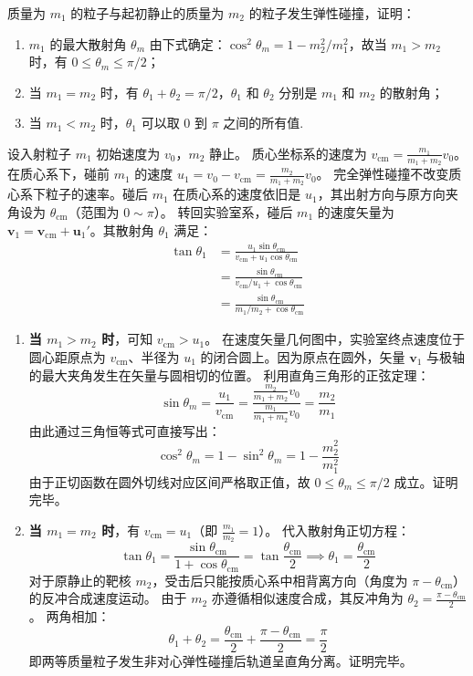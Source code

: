 \begin{exercise}\label{ex:5.11}
质量为 $m_1$ 的粒子与起初静止的质量为 $m_2$ 的粒子发生弹性碰撞，证明：
\begin{enumerate}
  \item[(a)] $m_1$ 的最大散射角 $\theta_m$ 由下式确定：$\cos^2 \theta_m = 1 - m_2^2/m_1^2$，故当 $m_1 > m_2$ 时，有 $0 \le \theta_m \le \pi/2$；
  \item[(b)] 当 $m_1 = m_2$ 时，有 $\theta_1 + \theta_2 = \pi/2$，$\theta_1$ 和 $\theta_2$ 分别是 $m_1$ 和 $m_2$ 的散射角；
  \item[(c)] 当 $m_1 < m_2$ 时，$\theta_1$ 可以取 $0$ 到 $\pi$ 之间的所有值.
\end{enumerate}
\end{exercise}
\begin{solution}
设入射粒子 $m_1$ 初始速度为 $v_0$，$m_2$ 静止。
质心坐标系的速度为 $v_{\text{cm}} = \frac{m_1}{m_1 + m_2} v_0$。
在质心系下，碰前 $m_1$ 的速度 $u_1 = v_0 - v_{\text{cm}} = \frac{m_2}{m_1 + m_2} v_0$。
完全弹性碰撞不改变质心系下粒子的速率。碰后 $m_1$ 在质心系的速度依旧是 $u_1$，其出射方向与原方向夹角设为 $\theta_{\text{cm}}$（范围为 $0 \sim \pi$）。
转回实验室系，碰后 $m_1$ 的速度矢量为 $\boldsymbol{v}_1 = \boldsymbol{v}_{\text{cm}} + \boldsymbol{u}_1'$。其散射角 $\theta_1$ 满足：
\[
\begin{aligned}
\tan \theta_1 &= \frac{u_1 \sin \theta_{\text{cm}}}{v_{\text{cm}} + u_1 \cos \theta_{\text{cm}}}\\
  &= \frac{\sin \theta_{\text{cm}}}{v_{\text{cm}}/u_1 + \cos \theta_{\text{cm}}}\\
  &= \frac{\sin \theta_{\text{cm}}}{m_1/m_2 + \cos \theta_{\text{cm}}}
\end{aligned}
\]

\begin{enumerate}
    \item[(a)] \textbf{当 $m_1 > m_2$ 时}，可知 $v_{\text{cm}} > u_1$。
    在速度矢量几何图中，实验室终点速度位于圆心距原点为 $v_{\text{cm}}$、半径为 $u_1$ 的闭合圆上。因为原点在圆外，矢量 $\boldsymbol{v}_1$ 与极轴的最大夹角发生在矢量与圆相切的位置。
    利用直角三角形的正弦定理：
    $$ \sin \theta_m = \frac{u_1}{v_{\text{cm}}} = \frac{\frac{m_2}{m_1+m_2}v_0}{\frac{m_1}{m_1+m_2}v_0} = \frac{m_2}{m_1} $$
    由此通过三角恒等式可直接写出：
    $$ \cos^2 \theta_m = 1 - \sin^2 \theta_m = 1 - \frac{m_2^2}{m_1^2} $$
    由于正切函数在圆外切线对应区间严格取正值，故 $0 \le \theta_m \le \pi/2$ 成立。证明完毕。

    \item[(b)] \textbf{当 $m_1 = m_2$ 时}，有 $v_{\text{cm}} = u_1$（即 $\frac{m_1}{m_2} = 1$）。
    代入散射角正切方程：
    $$ \tan \theta_1 = \frac{\sin \theta_{\text{cm}}}{1 + \cos \theta_{\text{cm}}} = \tan \frac{\theta_{\text{cm}}}{2} \implies \theta_1 = \frac{\theta_{\text{cm}}}{2} $$
    对于原静止的靶核 $m_2$，受击后只能按质心系中相背离方向（角度为 $\pi - \theta_{\text{cm}}$）的反冲合成速度运动。
    由于 $m_2$ 亦遵循相似速度合成，其反冲角为 $\theta_2 = \frac{\pi - \theta_{\text{cm}}}{2}$。
    两角相加：
    $$ \theta_1 + \theta_2 = \frac{\theta_{\text{cm}}}{2} + \frac{\pi - \theta_{\text{cm}}}{2} = \frac{\pi}{2} $$
    即两等质量粒子发生非对心弹性碰撞后轨道呈直角分离。证明完毕。


\end{enumerate}
\end{solution}

